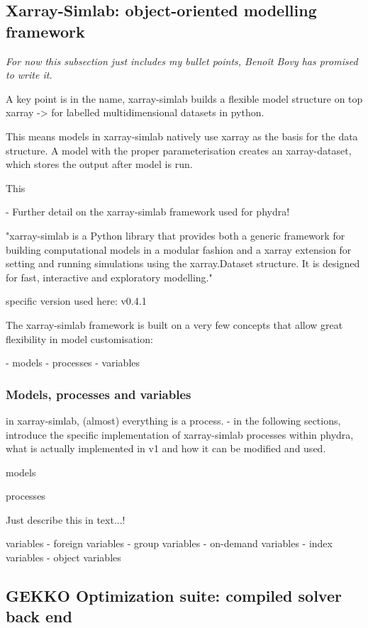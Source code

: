 \subsection{Xarray-Simlab: object-oriented modelling framework}
\textit{For now this subsection just includes my bullet points, Benoît Bovy has promised to write it.}

A key point is in the name, xarray-simlab builds a flexible model structure on top xarray -> for labelled multidimensional datasets in python.

This means models in xarray-simlab natively use xarray as the basis for the data structure. A model with the proper parameterisation creates an xarray-dataset, which stores the output after model is run.

This 

- Further detail on the xarray-simlab framework used for phydra!

"xarray-simlab is a Python library that provides both a generic framework for building computational models in a modular fashion and a xarray extension for setting and running simulations using the xarray.Dataset structure. It is designed for fast, interactive and exploratory modelling."


specific version used here: v0.4.1 \cite{benoit_bovy_2020_3755979}


The xarray-simlab framework is built on a very few concepts that allow great flexibility in model customisation:

- models
- processes
- variables

\subsubsection{Models, processes and variables}
in xarray-simlab, (almost) everything is a process.
- in the following sections, introduce the specific implementation of xarray-simlab processes within phydra, what is actually implemented in v1 and how it can be modified and used.

models

processes

Just describe this in text...!

variables
- foreign variables
- group variables
- on-demand variables
- index variables
- object variables


\subsection{GEKKO Optimization suite: compiled solver back end}

